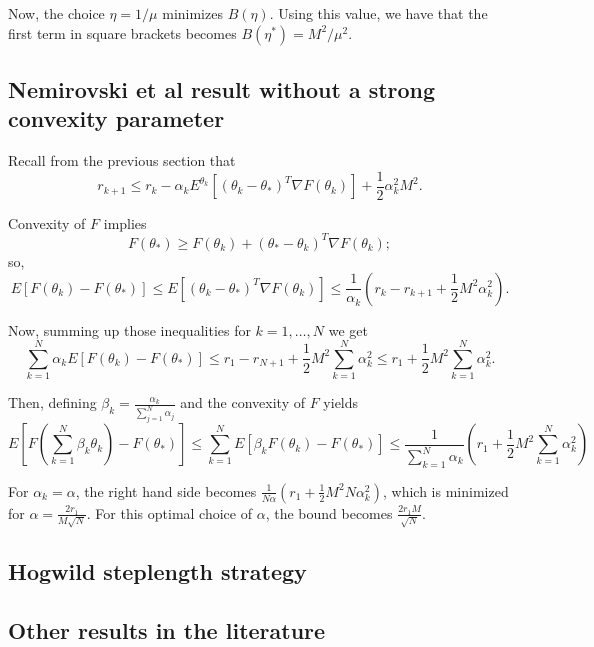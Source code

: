 \documentclass[12pt]{article}
\begin{document}
Now, the choice $\eta= 1/\mu$ minimizes $B(\eta)$. Using this value, we have that the first term in square brackets becomes $B(\eta^*)=  M^2/\mu^2$.


\bigskip

\subsection{Nemirovski et al\cite{nemirovski:2009} result without a strong convexity parameter}

Recall from the previous section that
\[
 r_{k+1} \leq r_k -\alpha_k E^{\theta_k}[(\theta_k-\theta_\ast)^T\nabla F(\theta_k)] + \frac{1}{2}\alpha_k^2M^2.
\]

Convexity of $F$ implies
\[
 F(\theta_\ast) \geq F(\theta_k) + (\theta_\ast-\theta_k)^T\nabla F(\theta_k);
\]
so,
\[
 E[F(\theta_k)-F(\theta_\ast)] \leq  E[(\theta_k-\theta_\ast)^T\nabla F(\theta_k)] \leq \frac{1}{\alpha_k}\left(r_k-r_{k+1}+\frac{1}{2}M^2\alpha_k^2\right).
\]

\bigskip

Now, summing up those inequalities for $k=1,\dots,N$ we get
\[
 \sum_{k=1}^N \alpha_k E[F(\theta_k)-F(\theta_\ast)] \leq r_1 - r_{N+1} + \frac{1}{2}M^2\sum_{k=1}^N\alpha_k^2 \leq r_1 + \frac{1}{2}M^2\sum_{k=1}^N\alpha_k^2.
\]

Then, defining $\displaystyle\beta_k=\frac{\alpha_k}{\sum_{j=1}^N\alpha_j}$ and the convexity of $F$ yields
\[
 E\left[F\left(\sum_{k=1}^N\beta_k\theta_k\right)-F(\theta_\ast)\right] \leq \sum_{k=1}^N E[\beta_kF(\theta_k)-F(\theta_\ast)] \leq \frac{1}{\sum_{k=1}^{N}\alpha_k}\left(r_1+\frac{1}{2}M^2 \sum_{k=1}^{N}\alpha_k^2\right)
\]
    
For $\alpha_k = \alpha$, the right hand side becomes $\frac{1}{N\alpha}\left(r_1+\frac{1}{2}M^2 N\alpha_k^2\right)$, which is minimized for $\alpha = \displaystyle\frac{2r_1}{M\sqrt{N}}$.  For this optimal choice of $\alpha$, the bound becomes $\displaystyle\frac{2r_1M}{\sqrt{N}}$.

         
\bigskip

\subsection{Hogwild steplength strategy \cite{hogwild}}


\bigskip

\subsection{Other results in the literature}
\end{document}
